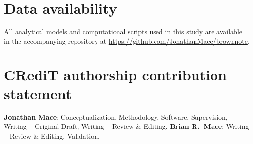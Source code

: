 \documentclass[review]{elsarticle}
\begin{document}
\graphicspath{{figures/}}
















\section*{Data availability}
All analytical models and computational scripts used in this study are
available in the accompanying repository at
\url{https://github.com/JonathanMace/brownnote}.

\section*{CRediT authorship contribution statement}
\textbf{Jonathan Mace}: Conceptualization, Methodology, Software, Supervision,
Writing -- Original Draft, Writing -- Review \& Editing.
\textbf{Brian R.\ Mace}: Writing -- Review \& Editing, Validation.
\end{document}

